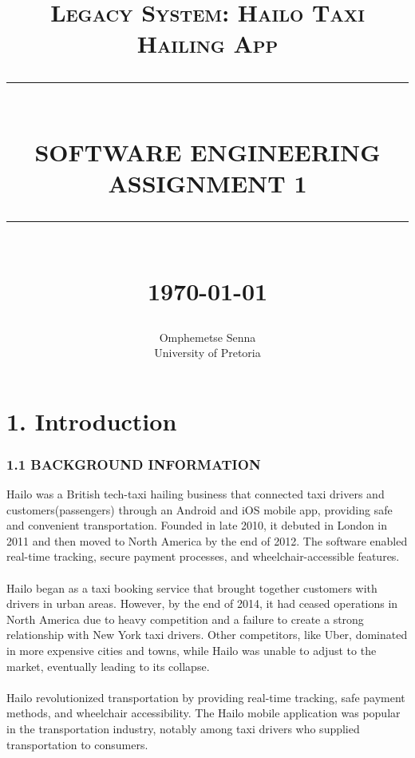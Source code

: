 \documentclass[9pt]{report}
\newcommand{\HRule}[1]{\rule{\linewidth}{#1}}
\begin{document}
\title{ \normalsize \textsc{Legacy System: Hailo Taxi Hailing App}
		\\ [2.0cm]
		\HRule{0.5pt} \\
		\LARGE \textbf{\uppercase{SOFTWARE ENGINEERING ASSIGNMENT 1}}
		\HRule{2pt} \\ [0.5cm]
		\normalsize \today \vspace*{5\baselineskip}}

\date{}

\author{
		Omphemetse Senna \\ 
		University of Pretoria \\ }

\maketitle
\newpage

\sectionfont{\scshape}


\section*{1. Introduction}
\subsubsection*{1.1 BACKGROUND INFORMATION}
Hailo was a British tech-taxi hailing business\cite{intro}\cite{pessok} that connected taxi drivers and customers(passengers) through an Android and iOS mobile app\cite{mobile}, providing safe and convenient transportation\cite{app}. Founded in late 2010, it debuted in London in 2011 and then moved to North America\cite{citekey} by the end of 2012. The software enabled real-time tracking, secure payment processes, and wheelchair-accessible features.
\\\\
Hailo began as a taxi booking service that brought together customers with drivers in urban areas. However, by the end of 2014, it had ceased operations in North America due to heavy competition and a failure to create a strong relationship with New York taxi drivers. Other competitors, like Uber, dominated in more expensive cities and towns, while Hailo was unable to adjust to the market, eventually leading to its collapse. 
\\\\Hailo revolutionized\cite{riches} transportation by providing real-time tracking, safe payment methods, and wheelchair accessibility\cite{intro}. The Hailo mobile application was popular in the transportation industry, notably among taxi drivers who supplied transportation to consumers.
\end{document}
